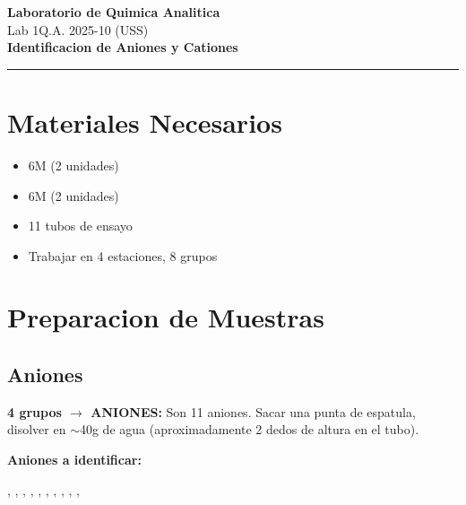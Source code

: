 \documentclass[11pt,a4paper]{article}
\begin{document}
\begin{center}
    {\LARGE\bfseries\color{azuloscuro} Laboratorio de Quimica Analitica}\\[0.5cm]
    {\Large Lab 1Q.A. 2025-10 (USS)}\\[1cm]
    {\Huge\bfseries Identificacion de Aniones y Cationes}\\[1.5cm]
    \rule{\textwidth}{1pt}
\end{center}

\vspace{1cm}

\section{Materiales Necesarios}

\begin{itemize}[leftmargin=*]
    \item {} 6M (2 unidades)
    \item {} 6M (2 unidades)
    \item 11 tubos de ensayo
    \item Trabajar en 4 estaciones, 8 grupos
\end{itemize}

\section{Preparacion de Muestras}

\subsection{Aniones}
\textbf{4 grupos $\rightarrow$ ANIONES:} Son 11 aniones. Sacar una punta de espatula, disolver en $\sim$40g de agua (aproximadamente 2 dedos de altura en el tubo).

\vspace{0.3cm}
\textbf{Aniones a identificar:}
\begin{center}
, , , , , , , , , , 
\end{center}
\end{document}
